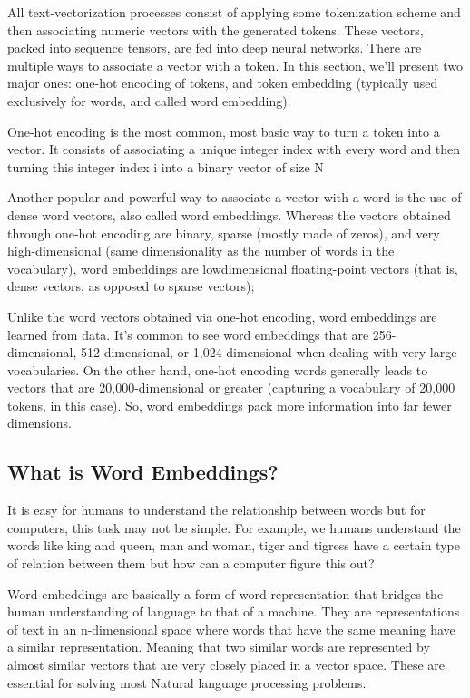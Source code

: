\documentclass[11pt]{article}
\begin{document}
    All text-vectorization processes consist of applying some tokenization
scheme and then associating numeric vectors with the generated tokens.
These vectors, packed into sequence tensors, are fed into deep neural
networks. There are multiple ways to associate a vector with a token. In
this section, we'll present two major ones: one-hot encoding of tokens,
and token embedding (typically used exclusively for words, and called
word embedding).

    One-hot encoding is the most common, most basic way to turn a token into
a vector. It consists of associating a unique integer index with every
word and then turning this integer index i into a binary vector of size
N

    Another popular and powerful way to associate a vector with a word is
the use of dense word vectors, also called word embeddings. Whereas the
vectors obtained through one-hot encoding are binary, sparse (mostly
made of zeros), and very high-dimensional (same dimensionality as the
number of words in the vocabulary), word embeddings are lowdimensional
floating-point vectors (that is, dense vectors, as opposed to sparse
vectors);

    Unlike the word vectors obtained via one-hot encoding, word embeddings
are learned from data. It's common to see word embeddings that are
256-dimensional, 512-dimensional, or 1,024-dimensional when dealing with
very large vocabularies. On the other hand, one-hot encoding words
generally leads to vectors that are 20,000-dimensional or greater
(capturing a vocabulary of 20,000 tokens, in this case). So, word
embeddings pack more information into far fewer dimensions.

    \hypertarget{what-is-word-embeddings}{%
\subsection{What is Word Embeddings?}\label{what-is-word-embeddings}}

    It is easy for humans to understand the relationship between words but
for computers, this task may not be simple. For example, we humans
understand the words like king and queen, man and woman, tiger and
tigress have a certain type of relation between them but how can a
computer figure this out?

Word embeddings are basically a form of word representation that bridges
the human understanding of language to that of a machine. They are
representations of text in an n-dimensional space where words that have
the same meaning have a similar representation. Meaning that two similar
words are represented by almost similar vectors that are very closely
placed in a vector space. These are essential for solving most Natural
language processing problems.
\end{document}
